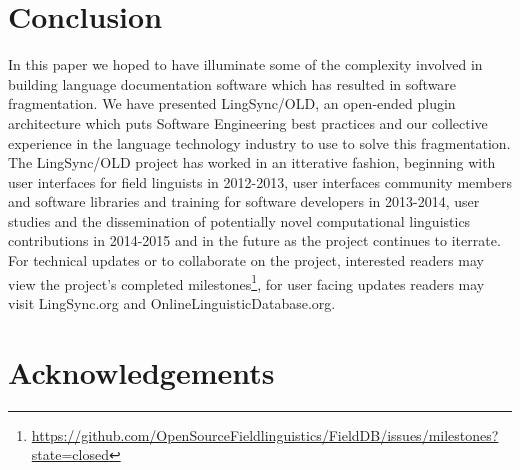 \documentclass[11pt]{article}
\begin{document}
\section{Conclusion}



In this paper we hoped to have illuminate some of the complexity involved in building language documentation software which has resulted in software fragmentation. We have presented LingSync/OLD,  an open-ended plugin architecture which puts Software Engineering best practices and our collective experience in the language technology industry  to use to solve this fragmentation. The LingSync/OLD project has worked in an itterative fashion, beginning with user interfaces for field linguists in 2012-2013, user interfaces community members and software libraries and training for software developers in 2013-2014, user studies and the dissemination of  potentially novel computational linguistics contributions in 2014-2015 and in the future as the project continues to iterrate.  For technical updates or to collaborate on the project, interested readers may view the project's completed milestones\footnote{\url{https://github.com/OpenSourceFieldlinguistics/FieldDB/issues/milestones?state=closed} }, for user facing updates readers may visit  LingSync.org and OnlineLinguisticDatabase.org. 


\section*{Acknowledgements}
\end{document}
